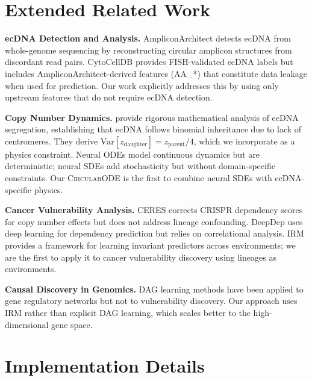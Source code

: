 \documentclass[sigconf,anonymous]{acmart}
\newcommand{\circularode}{\textsc{CircularODE}}
\begin{document}
\section{Extended Related Work}
\label{app:related}

\textbf{ecDNA Detection and Analysis.} AmpliconArchitect \cite{deshpande_2019_amplicon} detects ecDNA from whole-genome sequencing by reconstructing circular amplicon structures from discordant read pairs. CytoCellDB \cite{cytocelldb_2024} provides FISH-validated ecDNA labels but includes AmpliconArchitect-derived features (AA\_*) that constitute data leakage when used for prediction. Our work explicitly addresses this by using only upstream features that do not require ecDNA detection.

\textbf{Copy Number Dynamics.} \citet{lange_2022_mathematical} provide rigorous mathematical analysis of ecDNA segregation, establishing that ecDNA follows binomial inheritance due to lack of centromeres. They derive $\text{Var}[z_{\text{daughter}}] = z_{\text{parent}}/4$, which we incorporate as a physics constraint. Neural ODEs \cite{chen_2018_neuralode} model continuous dynamics but are deterministic; neural SDEs \cite{li_2020_neuralsde} add stochasticity but without domain-specific constraints. Our \circularode{} is the first to combine neural SDEs with ecDNA-specific physics.

\textbf{Cancer Vulnerability Analysis.} CERES \cite{meyers_2017_ceres} corrects CRISPR dependency scores for copy number effects but does not address lineage confounding. DeepDep \cite{deepdep_2021} uses deep learning for dependency prediction but relies on correlational analysis. IRM \cite{arjovsky_2019_irm} provides a framework for learning invariant predictors across environments; we are the first to apply it to cancer vulnerability discovery using lineages as environments.

\textbf{Causal Discovery in Genomics.} DAG learning methods \cite{zheng_2018_notears} have been applied to gene regulatory networks but not to vulnerability discovery. Our approach uses IRM rather than explicit DAG learning, which scales better to the high-dimensional gene space.


\section{Implementation Details}
\label{app:implementation}
\end{document}
